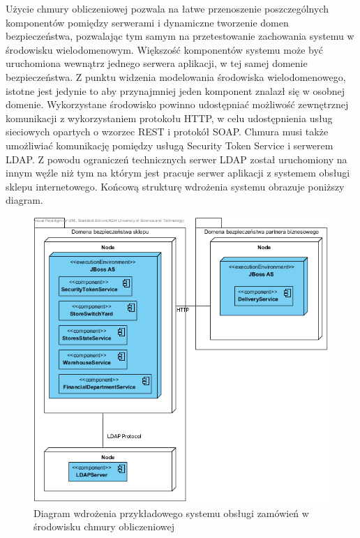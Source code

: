 Użycie chmury obliczeniowej pozwala na łatwe przenoszenie poszczególnych komponentów pomiędzy serwerami i dynamiczne tworzenie domen bezpieczeństwa, pozwalając tym samym na przetestowanie zachowania systemu w środowisku wielodomenowym. Większość komponentów systemu może być uruchomiona wewnątrz jednego serwera aplikacji, w tej samej domenie bezpieczeństwa. Z punktu widzenia modelowania środowiska wielodomenowego, istotne jest jedynie to aby przynajmniej jeden komponent znalazł się w osobnej domenie.
Wykorzystane środowisko powinno udostępniać możliwość zewnętrznej komunikacji z wykorzystaniem protokołu HTTP, w celu udostępnienia usług sieciowych opartych o wzorzec REST i protokół SOAP. Chmura musi także umożliwiać komunikację pomiędzy usługą Security Token Service i serwerem LDAP. Z powodu ograniczeń technicznych serwer LDAP został uruchomiony na innym węźle niż tym na którym jest pracuje serwer aplikacji z systemem obsługi sklepu internetowego.
Końcową strukturę wdrożenia systemu obrazuje poniższy diagram.

		\begin{figure}[h]
			\centering
			\includegraphics{img/DeploymentDiagram2.png}
			\caption{Diagram wdrożenia przykładowego systemu obsługi zamówień w środowisku chmury obliczeniowej}
			\label{DeploymentDiagram}
		\end{figure}



